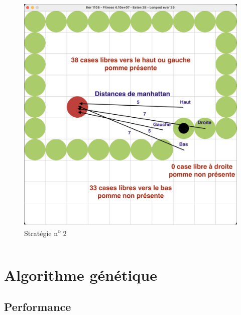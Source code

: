 \documentclass[10pt]{beamer}
\begin{document}
\begin{frame}
\begin{columns}[T]
\begin{column}{0.40\textwidth}
\begin{figure}
\vspace{-0.8cm}
\includegraphics[width=1\textwidth]{snake_vision_illustration.png}
\vspace{-0.7cm}
\caption*{\tiny Stratégie n\textsuperscript{o} 2}
\end{figure}

\end{column}
\end{columns}
\end{frame}

\section{Algorithme génétique}

\subsection{Performance}
\end{document}
